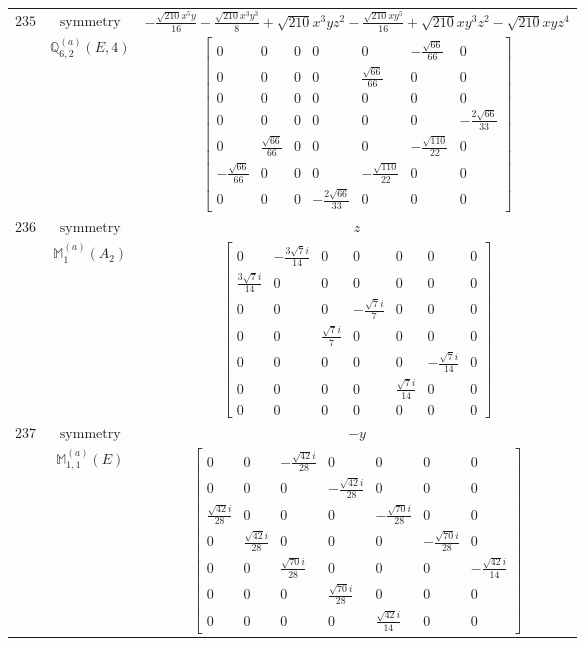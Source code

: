 \documentclass[fleqn,8pt,landscape]{jsarticle}
\begin{document}
\begin{longtable}{ccc}
$ 235 $ & $ \text{symmetry} $ & $ - \frac{\sqrt{210} x^{5} y}{16} - \frac{\sqrt{210} x^{3} y^{3}}{8} + \sqrt{210} x^{3} y z^{2} - \frac{\sqrt{210} x y^{5}}{16} + \sqrt{210} x y^{3} z^{2} - \sqrt{210} x y z^{4} $ \\
$  $ & $ \mathbb{Q}_{6,2}^{(a)}(E,4) $ & $ \begin{bmatrix} 0 & 0 & 0 & 0 & 0 & - \frac{\sqrt{66}}{66} & 0 \\ 0 & 0 & 0 & 0 & \frac{\sqrt{66}}{66} & 0 & 0 \\ 0 & 0 & 0 & 0 & 0 & 0 & 0 \\ 0 & 0 & 0 & 0 & 0 & 0 & - \frac{2 \sqrt{66}}{33} \\ 0 & \frac{\sqrt{66}}{66} & 0 & 0 & 0 & - \frac{\sqrt{110}}{22} & 0 \\ - \frac{\sqrt{66}}{66} & 0 & 0 & 0 & - \frac{\sqrt{110}}{22} & 0 & 0 \\ 0 & 0 & 0 & - \frac{2 \sqrt{66}}{33} & 0 & 0 & 0 \end{bmatrix} $ \\ \hline
$ 236 $ & $ \text{symmetry} $ & $ z $ \\
$  $ & $ \mathbb{M}_{1}^{(a)}(A_{2}) $ & $ \begin{bmatrix} 0 & - \frac{3 \sqrt{7} i}{14} & 0 & 0 & 0 & 0 & 0 \\ \frac{3 \sqrt{7} i}{14} & 0 & 0 & 0 & 0 & 0 & 0 \\ 0 & 0 & 0 & - \frac{\sqrt{7} i}{7} & 0 & 0 & 0 \\ 0 & 0 & \frac{\sqrt{7} i}{7} & 0 & 0 & 0 & 0 \\ 0 & 0 & 0 & 0 & 0 & - \frac{\sqrt{7} i}{14} & 0 \\ 0 & 0 & 0 & 0 & \frac{\sqrt{7} i}{14} & 0 & 0 \\ 0 & 0 & 0 & 0 & 0 & 0 & 0 \end{bmatrix} $ \\ \hline
$ 237 $ & $ \text{symmetry} $ & $ - y $ \\
$  $ & $ \mathbb{M}_{1,1}^{(a)}(E) $ & $ \begin{bmatrix} 0 & 0 & - \frac{\sqrt{42} i}{28} & 0 & 0 & 0 & 0 \\ 0 & 0 & 0 & - \frac{\sqrt{42} i}{28} & 0 & 0 & 0 \\ \frac{\sqrt{42} i}{28} & 0 & 0 & 0 & - \frac{\sqrt{70} i}{28} & 0 & 0 \\ 0 & \frac{\sqrt{42} i}{28} & 0 & 0 & 0 & - \frac{\sqrt{70} i}{28} & 0 \\ 0 & 0 & \frac{\sqrt{70} i}{28} & 0 & 0 & 0 & - \frac{\sqrt{42} i}{14} \\ 0 & 0 & 0 & \frac{\sqrt{70} i}{28} & 0 & 0 & 0 \\ 0 & 0 & 0 & 0 & \frac{\sqrt{42} i}{14} & 0 & 0 \end{bmatrix} $ \\ \hline

\end{longtable}
\end{document}
